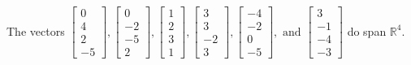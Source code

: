 \begin{exercise}
\begin{exerciseStatement}
  \end{exerciseStatement}
  \begin{exerciseAnswer}
   The vectors \(\left[\begin{array}{r}
0 \\
4 \\
2 \\
-5
\end{array}\right] , \left[\begin{array}{r}
0 \\
-2 \\
-5 \\
2
\end{array}\right] , \left[\begin{array}{r}
1 \\
2 \\
3 \\
1
\end{array}\right] , \left[\begin{array}{r}
3 \\
3 \\
-2 \\
3
\end{array}\right] , \left[\begin{array}{r}
-4 \\
-2 \\
0 \\
-5
\end{array}\right] , \text{ and } \left[\begin{array}{r}
3 \\
-1 \\
-4 \\
-3
\end{array}\right]\) 
  	 do  
	span \(\mathbb{R}^4\).
  


  \end{exerciseAnswer}
\end{exercise}